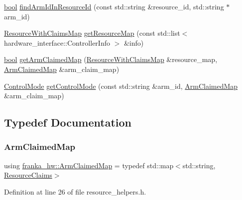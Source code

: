 \begin{DoxyCompactItemize}
\item 
\hyperlink{classbool}{bool} \hyperlink{namespacefranka__hw_aa86d54ddd446acb5a2101bfcc944b2c8}{find\+Arm\+Id\+In\+Resource\+Id} (const std\+::string \&resource\+\_\+id, std\+::string $\ast$arm\+\_\+id)
\item 
\hyperlink{namespacefranka__hw_a1fae0c56c9a08fdeb137e601f876cc77}{Resource\+With\+Claims\+Map} \hyperlink{namespacefranka__hw_a6c621829dd30c8ff939de6ae0861966d}{get\+Resource\+Map} (const std\+::list$<$ hardware\+\_\+interface\+::\+Controller\+Info $>$ \&info)
\item 
\hyperlink{classbool}{bool} \hyperlink{namespacefranka__hw_af08f089686416ffb7904fbe86f19b8a9}{get\+Arm\+Claimed\+Map} (\hyperlink{namespacefranka__hw_a1fae0c56c9a08fdeb137e601f876cc77}{Resource\+With\+Claims\+Map} \&resource\+\_\+map, \hyperlink{namespacefranka__hw_a9b9c672b3e064953e816024fc2f9cf0f}{Arm\+Claimed\+Map} \&arm\+\_\+claim\+\_\+map)
\item 
\hyperlink{namespacefranka__hw_afa416558ce4baace5ac6c71bd5d2c98c}{Control\+Mode} \hyperlink{namespacefranka__hw_a21fc3cb90700f7fc2b9b9a93c2d40d0a}{get\+Control\+Mode} (const std\+::string \&arm\+\_\+id, \hyperlink{namespacefranka__hw_a9b9c672b3e064953e816024fc2f9cf0f}{Arm\+Claimed\+Map} \&arm\+\_\+claim\+\_\+map)
\end{DoxyCompactItemize}


\subsection{Typedef Documentation}
\mbox{\label{namespacefranka__hw_a9b9c672b3e064953e816024fc2f9cf0f}} 
\subsubsection{\texorpdfstring{Arm\+Claimed\+Map}{ArmClaimedMap}}
{\footnotesize\ttfamily using \hyperlink{namespacefranka__hw_a9b9c672b3e064953e816024fc2f9cf0f}{franka\+\_\+hw\+::\+Arm\+Claimed\+Map} = typedef std\+::map$<$std\+::string, \hyperlink{structfranka__hw_1_1ResourceClaims}{Resource\+Claims}$>$}



Definition at line 26 of file resource\+\_\+helpers.\+h.

\mbox{\label{namespacefranka__hw_a1fae0c56c9a08fdeb137e601f876cc77}} 
